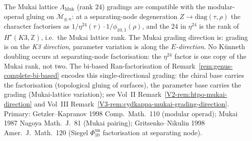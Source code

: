 \begin{remark}
\label{rem:genus-complete-mukai-modular}
The Mukai lattice $\Lambda_{\mathrm{Muk}}$ (rank $24$) gradings
are compatible with the modular-operad gluing on
$\overline{\mathcal{M}}_{g,n}$: at a separating-node degeneration
$Z \to \mathrm{diag}(\tau,\rho)$ the character factorises as
$1/\eta^{24}(\tau) \cdot 1/\phi_{10,1}(\rho)$, and the $24$ in
$\eta^{24}$ is the rank of $H^\star(K3,\mathbb Z)$, i.e.\ the Mukai
lattice rank. The Mukai grading direction is: grading is on the
\emph{K3 direction}, parameter variation is along the
\emph{$E$-direction}. No K\"unneth doubling occurs at
separating-node factorisation: the $\eta^{24}$ factor is one copy of
the Mukai rank, not two. The bi-based Ran-factorisation of
Remark~\ref{rem:genus-complete-bi-based} encodes this
single-directional grading: the chiral base carries the factorisation
(topological gluing of surfaces), the parameter base carries the
grading (Mukai-lattice variation); see Vol~II
Remark~\ref{V2-rem:htpo-mukai-direction} and Vol~III
Remark~\ref{V3-rem:cydkappa-mukai-grading-direction}. Primary:
Getzler--Kapranov 1998 Comp.~Math.~110 (modular operad);
Mukai 1987 Nagoya Math.~J.~81 (Mukai pairing); Gritsenko--Nikulin
1998 Amer.~J.~Math.~120 (Siegel $\Phi_{10}^{\mathrm{un}}$ factorisation at
separating node).
\end{remark}
